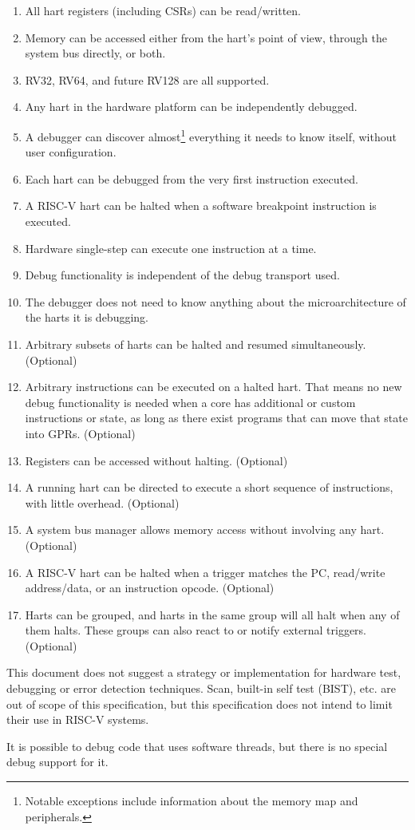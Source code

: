 \begin{enumerate}
   \item All hart registers (including CSRs) can be read/written.
   \item Memory can be accessed either from the hart's point of view, through
       the system bus directly, or both.
   \item RV32, RV64, and future RV128 are all supported.
   \item Any hart in the hardware platform can be independently debugged.
   \item A debugger can discover almost\footnote{Notable exceptions include
       information about the memory map and peripherals.} everything it needs
       to know itself, without user configuration.
   \item Each hart can be debugged from the very first instruction executed.
   \item A RISC-V hart can be halted when a software breakpoint instruction is
       executed.
   \item Hardware single-step can execute one instruction at a time.
   \item Debug functionality is independent of the debug transport used.
   \item The debugger does not need to know anything about the microarchitecture
       of the harts it is debugging.

   \item Arbitrary subsets of harts can be halted and resumed simultaneously.
       (Optional)
   \item Arbitrary instructions can be executed on
       a halted hart. That means no new debug functionality is needed when a
       core has additional or custom instructions or state, as
       long as there exist programs
       that can move that state into GPRs. (Optional)
   \item Registers can be accessed without halting. (Optional)
   \item A running hart can be directed to execute a short sequence
       of instructions, with little overhead. (Optional)
   \item A system bus manager allows memory access without
       involving any hart. (Optional)
   \item A RISC-V hart can be halted when a trigger matches the PC,
       read/write address/data, or an instruction opcode. (Optional)
    \item Harts can be grouped, and harts in the same group will all halt when
        any of them halts. These groups can also react to or notify external
        triggers. (Optional)
\end{enumerate}

This document does not suggest a strategy or implementation for hardware test,
debugging or error detection techniques. Scan, built-in self test (BIST), etc. are out of scope of
this specification, but this specification does not intend to limit their use
in RISC-V systems.

It is possible to debug code that uses software threads, but there is no
special debug support for it.
